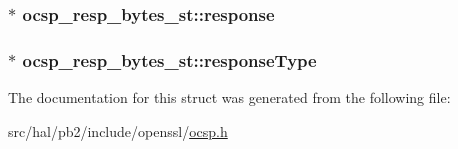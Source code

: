 \subsubsection[{\texorpdfstring{response}{response}}]{$\ast$ ocsp\+\_\+resp\+\_\+bytes\+\_\+st\+::response}\hypertarget{structocsp__resp__bytes__st_a98f9926c70716d7d4438aa7e87d17649}{}\label{structocsp__resp__bytes__st_a98f9926c70716d7d4438aa7e87d17649}
\subsubsection[{\texorpdfstring{response\+Type}{responseType}}]{$\ast$ ocsp\+\_\+resp\+\_\+bytes\+\_\+st\+::response\+Type}\hypertarget{structocsp__resp__bytes__st_a304d3f8cf4f98279dca0624763ce8b01}{}\label{structocsp__resp__bytes__st_a304d3f8cf4f98279dca0624763ce8b01}


The documentation for this struct was generated from the following file\+:\begin{DoxyCompactItemize}
\item 
src/hal/pb2/include/openssl/\hyperlink{ocsp_8h}{ocsp.\+h}\end{DoxyCompactItemize}
